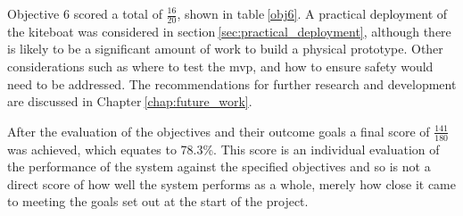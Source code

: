 \begin{table}[!htb]
    \centering
    \caption{Objective 6 Evaluation}\label{obj6}
\end{table}

Objective 6 scored a total of $\frac{16}{20}$, shown in table$~$\ref{obj6}. A practical deployment of the kiteboat was considered in section$~$\ref{sec:practical_deployment}, although there is likely to be a significant amount of work to build a physical prototype. Other considerations such as where to test the mvp, and how to ensure safety would need to be addressed. The recommendations for further research and development are discussed in Chapter$~$\ref{chap:future_work}. 


After the evaluation of the objectives and their outcome goals a final score of $\frac{141}{180}$ was achieved, which equates to 78.3\%. This score is an individual evaluation of the performance of the system against the specified objectives and so is not a direct score of how well the system performs as a whole, merely how close it came to meeting the goals set out at the start of the project. 
